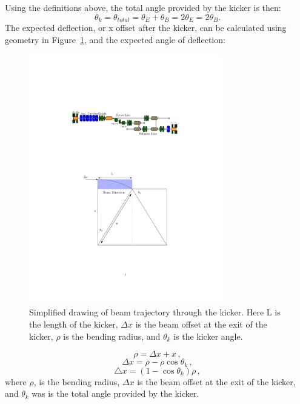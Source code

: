 \documentclass[aps,prab,preprint,groupedaddress,linenumbers]{revtex4-2}
\begin{document}
Using the definitions above, the total angle provided by the kicker is then: 
\begin{equation}
\theta_k = \theta_{total}= \theta_E+\theta_B=2\theta_E=2\theta_B.
\end{equation}
The expected deflection, or x offset after the kicker, can be calculated
using geometry in Figure~\ref{fig:kicker-geometry}, and the expected angle of deflection: 
\begin{figure}
\includegraphics[width=0.75\textwidth]{xoffset_geometry}
	\caption{Simplified drawing of beam trajectory through the kicker.
		Here L is the length of the kicker, $\Delta x$ is the beam offset at the exit of the kicker, 
		$\rho$ is the bending radius, and $\theta_k$ is the kicker angle. }
	\label{fig:kicker-geometry}
\end{figure}
\begin{equation}
\rho = \Delta x + x \, ,
\end{equation}
\begin{equation}
\Delta x = \rho - \rho \cos \theta_k \, ,
\end{equation}
\begin{equation}
\triangle x = \left(1-\cos\theta_{k}\right)\rho \, ,
\label{eq:kx}
\end{equation}
where $\rho$, is the bending radius, $\Delta x$ is the beam offset at the exit of the kicker, 
and $\theta_{k}$ was is the total angle provided by the kicker. 
\end{document}
